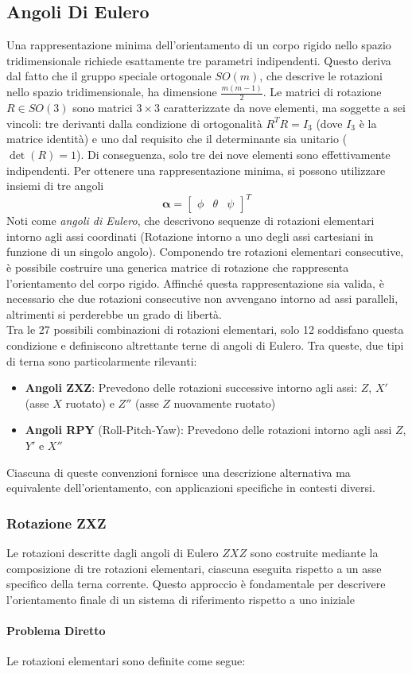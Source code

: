 ﻿\documentclass[11pt, a4paper]{article}
\begin{document}
\subsection{Angoli Di Eulero}
Una rappresentazione minima dell'orientamento di un corpo rigido nello spazio tridimensionale richiede esattamente tre parametri indipendenti. Questo deriva dal fatto che il gruppo speciale ortogonale $ SO(m) $, che descrive le rotazioni nello spazio tridimensionale, ha dimensione $\frac{m(m-1)}{2}$. Le matrici di rotazione $ R \in SO(3) $ sono matrici $ 3 \times 3 $ caratterizzate da nove elementi, ma soggette a sei vincoli: tre derivanti dalla condizione di ortogonalità $ R^T R = I_3 $ (dove $ I_3 $ è la matrice identità) e uno dal requisito che il determinante sia unitario ($ \det(R) = 1 $). Di conseguenza, solo tre dei nove elementi sono effettivamente indipendenti. Per ottenere una rappresentazione minima, si possono utilizzare insiemi di tre angoli
\[
    \boldsymbol{\alpha} =
    \begin{bmatrix}
        \phi & \theta & \psi
    \end{bmatrix}^{T}
\]
Noti come \textit{angoli di Eulero}, che descrivono sequenze di rotazioni elementari intorno agli assi coordinati (Rotazione intorno a uno degli assi cartesiani in funzione di un singolo angolo). Componendo tre rotazioni elementari consecutive, è possibile costruire una generica matrice di rotazione che rappresenta l'orientamento del corpo rigido. Affinché questa rappresentazione sia valida, è necessario che due rotazioni consecutive non avvengano intorno ad assi paralleli, altrimenti si perderebbe un grado di libertà.\\
Tra le 27 possibili combinazioni di rotazioni elementari, solo 12 soddisfano questa condizione e definiscono altrettante terne di angoli di Eulero. Tra queste, due tipi di terna sono particolarmente rilevanti:
\begin{itemize}
    \item \textbf{Angoli ZXZ}: Prevedono delle rotazioni successive intorno agli assi: $ Z $, $ X' $ (asse $ X $ ruotato) e $ Z'' $ (asse $ Z $ nuovamente ruotato)
    \item \textbf{Angoli RPY} (Roll-Pitch-Yaw): Prevedono delle rotazioni intorno agli assi $ Z $, $ Y' $ e $ X'' $
\end{itemize}
Ciascuna di queste convenzioni fornisce una descrizione alternativa ma equivalente dell'orientamento, con applicazioni specifiche in contesti diversi.

\subsubsection{Rotazione ZXZ}
Le rotazioni descritte dagli angoli di Eulero $ ZXZ $ sono costruite mediante la composizione di tre rotazioni elementari, ciascuna eseguita rispetto a un asse specifico della terna corrente. Questo approccio è fondamentale per descrivere l'orientamento finale di un sistema di riferimento rispetto a uno iniziale \paragraph{Problema Diretto} Le rotazioni elementari sono definite come segue:
\end{document}

